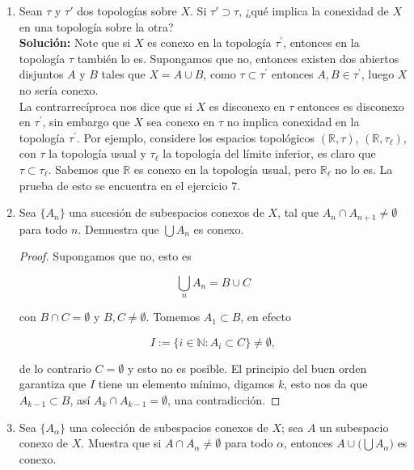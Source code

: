 \documentclass[11pt]{article}
\begin{document}
\begin{enumerate}
    \item Sean $\tau$ y $\tau'$ dos topologías sobre $X$. Si $\tau' \supset \tau$, ¿qué implica la conexidad de $X$ en una topología sobre la otra?\\

    \textbf{Solución:} Note que si $X$ es conexo en la topología $\tau^{\prime}$, entonces en la topología $\tau$ también lo es. Supongamos que no, entonces existen dos abiertos disjuntos $A$ y $B$ tales que $X=A\cup B$, como $\tau\subset \tau^{\prime}$ entonces $A,B\in \tau^{\prime}$, luego $X$ no sería conexo.\\

    La contrarrecíproca nos dice que si $X$ es disconexo en $\tau$ entonces es disconexo en $\tau^{\prime}$, sin embargo que $X$ sea conexo en $\tau$ no implica conexidad  en la topología $\tau^{\prime}$. Por ejemplo, considere los espacios topológicos $(\mathbb{R},\tau)$, $(\mathbb{R},\tau_{\ell})$, con $\tau$ la topología usual y $\tau_{\ell}$ la topología del límite inferior, es claro que $\tau\subset \tau_{\ell}$. Sabemos que $\mathbb{R}$ es conexo en la topología usual, pero $\mathbb{R}_{\ell}$ no lo es. La prueba de esto se encuentra en el ejercicio 7.
    
    \item Sea $\{A_n\}$ una sucesión de subespacios conexos de $X$, tal que $A_n \cap A_{n+1} \neq \emptyset$ para todo $n$. Demuestra que $\bigcup A_n$ es conexo.

    \begin{proof}
        Supongamos que no, esto es

        $$\bigcup_{n}A_n=B\cup C 
            $$

        con $B\cap C=\emptyset$ y $B,C\neq \emptyset$. Tomemos $A_1\subset B$, en efecto
        
        $$I:=\{ i\in\mathbb{N}: A_i\subset C\}\neq \emptyset,$$

        de lo contrario $C=\emptyset$ y esto no es posible. El principio del buen orden garantiza que $I$ tiene un elemento mínimo, digamos $k$, esto nos da que $A_{k-1}\subset B$, así $A_k\cap A_{k-1}=\emptyset$, una contradicción. 
    \end{proof}
    
    \item Sea $\{A_\alpha\}$ una colección de subespacios conexos de $X$; sea $A$ un subespacio conexo de $X$. Muestra que si $A \cap A_\alpha \neq \emptyset$ para todo $\alpha$, entonces $A \cup \big(\bigcup A_\alpha\big)$ es conexo.


\end{enumerate}
\end{document}
